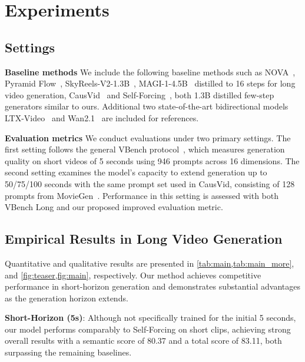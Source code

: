 \section{Experiments}

\subsection{Settings}
\textbf{Baseline methods} We include the following baseline methods such as NOVA~\citep{deng2024nova}, Pyramid Flow~\citep{jin2024pyramidal}, SkyReels-V2-1.3B~\citep{chen2025skyreels}, MAGI-1-4.5B~\citep{teng2025magi} distilled to 16 steps for long video generation, CausVid~\citep{yin2025causvid} and Self-Forcing~\citep{huang2025self}, both 1.3B distilled few-step generators similar to ours. Additional two state-of-the-art bidirectional models LTX-Video~\citep{hacohen2024ltx} and Wan2.1~\citep{wan2025} are included for references.

 
 \textbf{Evaluation metrics}
We conduct evaluations under two primary settings. The first setting follows the general VBench protocol~\citep{huang2024vbench}, which measures generation quality on short videos of 5 seconds using 946 prompts across 16 dimensions. The second setting examines the model’s capacity to extend generation up to 50/75/100 seconds with the same prompt set used in CausVid, consisting of 128 prompts from MovieGen~\citep{polyak2024movie}. Performance in this setting is assessed with both VBench Long and our proposed improved evaluation metric.

\subsection{Empirical Results in Long Video Generation}
Quantitative and qualitative results are presented in \cref{tab:main,tab:main_more}, and \cref{fig:teaser,fig:main}, respectively. Our method achieves competitive performance in short-horizon generation and demonstrates substantial advantages as the generation horizon extends.

\textbf{Short-Horizon (5s)}: Although not specifically trained for the initial 5 seconds, our model performs comparably to Self-Forcing on short clips, achieving strong overall results with a semantic score of 80.37 and a total score of 83.11, both surpassing the remaining baselines.
\begin{table}[h]
\vspace{-2pt}
      \caption{Performance comparisons on 5s short videos and 50s long videos. Baseline methods achieve high temporal quality scores primarily due to stagnation reflected by their dynamic degree.}  
      
      \label{tab:main}
\end{table}



